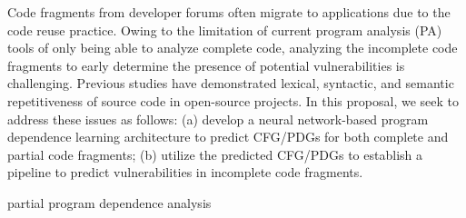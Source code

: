  Code fragments from developer forums often migrate to applications due to the code reuse practice. Owing to the limitation of current program analysis (PA) tools of only being able to analyze complete code, analyzing the incomplete code fragments to early determine the presence of potential vulnerabilities is challenging. Previous studies have demonstrated lexical, syntactic, and semantic repetitiveness of source code in open-source projects. In this proposal, we seek to address these issues as follows: (a) develop a neural network-based program dependence learning architecture to predict CFG/PDGs for both complete and partial code fragments; (b) utilize the predicted CFG/PDGs to establish a pipeline to predict vulnerabilities in incomplete code fragments.

\vspace{0.25em}
 partial program dependence analysis 